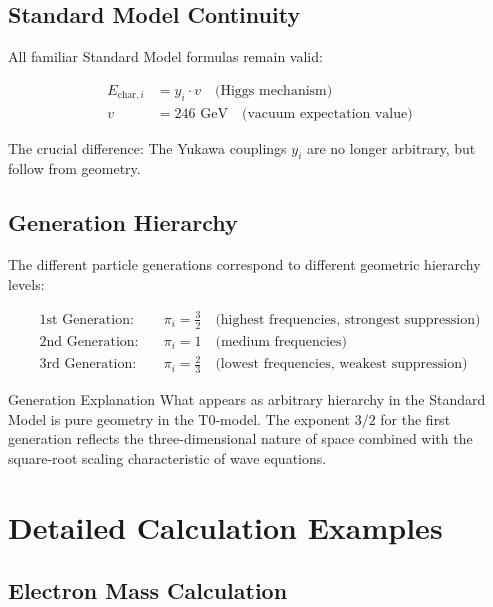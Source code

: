 \documentclass[12pt,a4paper]{article}
\begin{document}
	\subsection{Standard Model Continuity}
	\label{subsec:standard_model_continuity}
	
	All familiar Standard Model formulas remain valid:
	
	\begin{align}
		E_{\text{char},i} &= y_i \cdot v \quad \text{(Higgs mechanism)} \\
		v &= 246 \text{ GeV} \quad \text{(vacuum expectation value)}
	\end{align}
	
	The crucial difference: The Yukawa couplings $y_i$ are no longer arbitrary, but follow from geometry.
	
	\subsection{Generation Hierarchy}
	\label{subsec:generation_hierarchy}
	
	The different particle generations correspond to different geometric hierarchy levels:
	
	\begin{align}
		\text{1st Generation:} \quad &\pi_i = \frac{3}{2} \quad \text{(highest frequencies, strongest suppression)} \\
		\text{2nd Generation:} \quad &\pi_i = 1 \quad \text{(medium frequencies)} \\
		\text{3rd Generation:} \quad &\pi_i = \frac{2}{3} \quad \text{(lowest frequencies, weakest suppression)}
	\end{align}
	
	\begin{important}{Generation Explanation}{}
		What appears as arbitrary hierarchy in the Standard Model is pure geometry in the T0-model. The exponent $3/2$ for the first generation reflects the three-dimensional nature of space combined with the square-root scaling characteristic of wave equations.
	\end{important}
	
	\section{Detailed Calculation Examples}
	\label{sec:calculation_examples}
	
	\subsection{Electron Mass Calculation}
	\label{subsec:electron_calculation}
	
\end{document}

